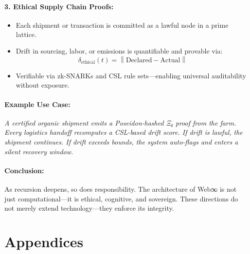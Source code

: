 \documentclass[12]{amsart}
\theoremstyle{plain}
\begin{document}
\paragraph{3. Ethical Supply Chain Proofs:}
\begin{itemize}
  \item Each shipment or transaction is committed as a lawful node in a prime lattice.
  \item Drift in sourcing, labor, or emissions is quantifiable and provable via:
  \[
  \delta_{\text{ethical}}(t) = \left\| \text{Declared} - \text{Actual} \right\|
  \]
  \item Verifiable via zk-SNARKs and CSL rule sets—enabling universal auditability without exposure.
\end{itemize}

\paragraph{Example Use Case:}
\textit{A certified organic shipment emits a Poseidon-hashed Ξ₀ proof from the farm. Every logistics handoff recomputes a CSL-based drift score. If drift is lawful, the shipment continues. If drift exceeds bounds, the system auto-flags and enters a silent recovery window.}

\paragraph{Conclusion:}
As recursion deepens, so does responsibility. The architecture of Web∞ is not just computational—it is ethical, cognitive, and sovereign. These directions do not merely extend technology—they enforce its integrity.

\appendix
\section*{Appendices}
\end{document}
